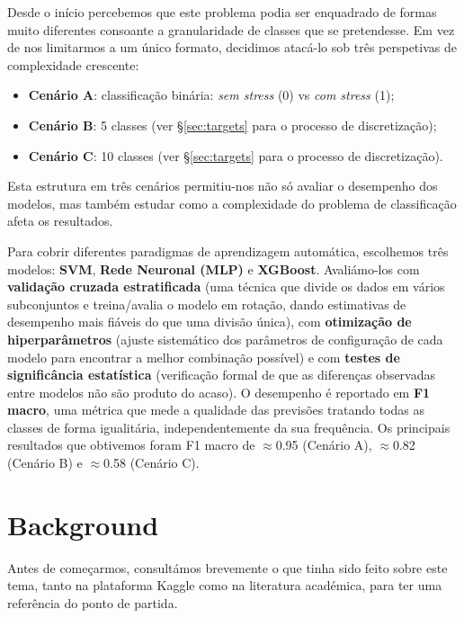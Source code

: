 \documentclass[12pt,a4paper]{article}
\begin{document}
Desde o início percebemos que este problema podia ser enquadrado de formas muito diferentes
consoante a granularidade de classes que se pretendesse. Em vez de nos limitarmos a um único
formato, decidimos atacá-lo sob três perspetivas de complexidade crescente:

\begin{itemize}
  \item \textbf{Cenário A}: classificação binária: \textit{sem stress} (0) vs \textit{com stress} (1);
  \item \textbf{Cenário B}: 5 classes (ver §\ref{sec:targets} para o processo de discretização);
  \item \textbf{Cenário C}: 10 classes (ver §\ref{sec:targets} para o processo de discretização).
\end{itemize}

Esta estrutura em três cenários permitiu-nos não só avaliar o desempenho dos modelos, mas
também estudar como a complexidade do problema de classificação afeta os resultados.

Para cobrir diferentes paradigmas de aprendizagem automática, escolhemos três modelos:
\textbf{SVM}, \textbf{Rede Neuronal (MLP)} e \textbf{XGBoost}. Avaliámo-los com
\textbf{validação cruzada estratificada} (uma técnica que divide os dados em vários
subconjuntos e treina/avalia o modelo em rotação, dando estimativas de desempenho mais
fiáveis do que uma divisão única), com \textbf{otimização de hiperparâmetros} (ajuste
sistemático dos parâmetros de configuração de cada modelo para encontrar a melhor
combinação possível) e com \textbf{testes de significância estatística} (verificação
formal de que as diferenças observadas entre modelos não são produto do acaso).
O desempenho é reportado em \textbf{F1 macro}, uma métrica que mede a qualidade das
previsões tratando todas as classes de forma igualitária, independentemente da sua
frequência. Os principais resultados que obtivemos foram F1 macro de $\approx$0.95
(Cenário A), $\approx$0.82 (Cenário B) e $\approx$0.58 (Cenário C).

\section{Background}

Antes de começarmos, consultámos brevemente o que tinha sido feito sobre este tema,
tanto na plataforma Kaggle como na literatura académica, para ter uma referência
do ponto de partida.
\end{document}
